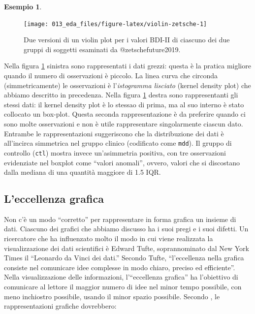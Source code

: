 \documentclass[
  11pt,
  italian,
  a4paper,
  extrafontsizes,onecolumn,openright
  ]{memoir}
\theoremstyle{definition}
\theoremstyle{definition}
\newtheorem{example}{Esempio}[chapter]
\theoremstyle{definition}
\theoremstyle{definition}
\theoremstyle{remark}
\begin{document}
\begin{example}
\begin{figure}[h]

{\centering \texttt{[image: 013\_eda\_files/figure-latex/violin-zetsche-1]} 

}

\caption{Due versioni di un violin plot per i valori BDI-II di ciascuno dei due gruppi di soggetti esaminati da @zetschefuture2019.}\label{fig:violin-zetsche}
\end{figure}

Nella figura \ref{fig:violin-zetsche} sinistra sono rappresentati i dati grezzi: questa è la pratica migliore quando il numero di osservazioni è piccolo. La linea curva che circonda (simmetricamente) le osservazioni è l'\emph{istogramma lisciato} (kernel density plot) che abbiamo descritto in precedenza. Nella figura \ref{fig:violin-zetsche} destra sono rappresentanti gli stessi dati: il kernel density plot è lo stessao di prima, ma al suo interno è stato collocato un box-plot. Questa seconda rappresentazione è da preferire quando ci sono molte osservazioni e non è utile rappresentare singolarmente ciascun dato. Entrambe le rappresentazioni suggeriscono che la distribuzione dei dati è all'incirca simmetrica nel gruppo clinico (codificato come \texttt{mdd}). Il gruppo di controllo (\texttt{ctl}) mostra invece un'asimmetria positiva, con tre osservazioni evidenziate nel boxplot come ``valori anomali'', ovvero, valori che si discostano dalla mediana di una quantità maggiore di 1.5 IQR.
\end{example}

\hypertarget{leccellenza-grafica}{%
\subsection{L'eccellenza grafica}\label{leccellenza-grafica}}

Non c'è un modo ``corretto'' per rappresentare in forma grafica un insieme
di dati. Ciascuno dei grafici che abbiamo discusso ha i suoi pregi e i
suoi difetti. Un ricercatore che ha influenzato molto il modo in cui
viene realizzata la visualizzazione dei dati scientifici è Edward Tufte,
soprannominato dal New York Times il ``Leonardo da Vinci dei dati.''
Secondo Tufte, ``l'eccellenza nella grafica consiste nel comunicare idee
complesse in modo chiaro, preciso ed efficiente''. Nella visualizzazione
delle informazioni, l'``eccellenza grafica'' ha l'obiettivo di comunicare
al lettore il maggior numero di idee nel minor tempo possibile, con meno
inchiostro possibile, usando il minor spazio possibile. Secondo
\textcite{tufte_visual_display}, le rappresentazioni grafiche dovrebbero:
\end{document}
